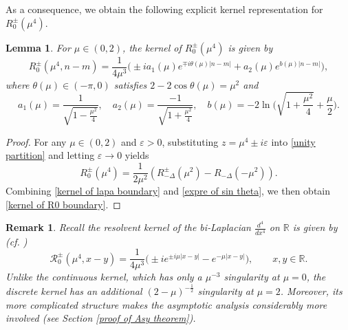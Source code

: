 \documentclass[reqno, 11pt]{amsart}
\newtheorem{lemma}[definition]{Lemma}
\newtheorem{remark}[definition]{Remark}
\newcommand\R{\mathbb{R}}
\newcommand\mcaR{\mathcal{R}}
\numberwithin{equation}{section}
\begin{document}
As a consequence, we obtain the following explicit kernel representation for $R^{\pm}_0(\mu^4)$.
\begin{lemma}\label{R0 kernel lemma}
{ For $\mu\in(0,2)$, the kernel of $R^{\pm}_0(\mu^4)$ is given by
\begin{equation}\label{kernel of R0 boundary}
R^{\pm}_{0}(\mu^4,n-m)
=\frac{1}{4\mu^3}\Big(\pm ia_1(\mu)e^{\mp i\theta(\mu)|n-m|}+a_2(\mu)e^{b(\mu)|n-m|}\Big),
\end{equation}
where $\theta(\mu)\in(-\pi,0)$ satisfies $2-2\cos\theta(\mu)=\mu^2$ and
\begin{equation}\label{exp of a1 a2 bu}
a_1(\mu)=\frac{1}{\sqrt{1-\frac{\mu^2}{4}}},\quad a_2(\mu)=\frac{-1}{\sqrt{1+\frac{\mu^2}{4}}},\quad b(\mu)=-2\ln \Big(\sqrt{1+\frac{\mu^2}{4}}+\frac{\mu}{2}\Big).
\end{equation}
}
\end{lemma}
  \begin{proof}
 For any $\mu\in(0,2)$ and $\varepsilon>0$, substituting $z=\mu^4\pm i\varepsilon$ into \eqref{unity partition} and letting $\varepsilon\rightarrow0$ yields
\begin{equation}\label{R0mu4 and Rdeltamu2}
R^{\pm}_{0}(\mu^4)=\frac{1}{2\mu^2}\left(R^{\pm}_{-\Delta}(\mu^2)-R_{-\Delta}(-\mu^2)\right).
\end{equation}
Combining \eqref{kernel of lapa boundary} and \eqref{expre of sin theta}, we then obtain
\eqref{kernel of R0 boundary}.
\end{proof}
\begin{remark}\label{remark of R0 kernel lema}
{\rm Recall the resolvent kernel of the bi‑Laplacian $\frac{d^4}{dx^4}$ on $\R$  is given by 
 (cf. \cite{SWY22})
$$\mcaR^{\pm}_0(\mu^4,x-y)=\frac{1}{4\mu^3}\big(\pm ie^{\pm i\mu|x-y|}-e^{-\mu|x-y|}\big),\qquad x,y\in \R.$$
Unlike the continuous kernel, which has only a $\mu^{-3}$ singularity
at $\mu=0$, the discrete kernel has an additional
$(2-\mu)^{-\frac12}$ singularity at $\mu=2$. Moreover, its more
complicated structure makes the asymptotic analysis considerably more involved (see Section \ref{proof of Asy theorem}).
}
\end{remark}
\end{document}
